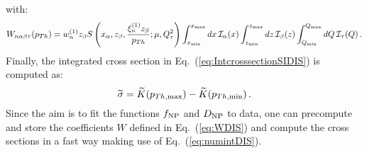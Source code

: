 \documentclass[10pt,a4paper]{article}
\begin{document}
with:
\begin{equation}\label{eq:WDIS}
 W_{n\alpha\beta\tau}(p_{Th}) = 
                                         w_n^{(1)} z_\beta S\left(x_\alpha,z_\beta,\frac{\xi_n^{(1)}z_\beta}{p_{Th}};\mu,Q_\tau^2\right) \int_{x_{\rm min}}^{x_{\rm
                                            max}}dx\,  \mathcal{I}_\alpha(x)\int_{z_{\rm min}}^{z_{\rm max}}dz\,
                                         \mathcal{I}_\beta(z)\int_{Q_{\rm min}}^{Q_{\rm
                                            max}}dQ\,\mathcal{I}_\tau(Q)\,.
\end{equation}
Finally, the integrated cross section in
Eq.~(\ref{eq:IntcrosssectionSIDIS}) is computed as:
\begin{equation}
\widetilde{\sigma} = \widetilde{K}(p_{Th,\rm max}) - \widetilde{K}(p_{Th,\rm min})\,.
\end{equation}
Since the aim is to fit the functions $f_{\rm NP}$ and $D_{\rm NP}$ to
data, one can precompute and store the coefficients $W$ defined in
Eq.~(\ref{eq:WDIS}) and compute the cross sections in a fast way
making use of Eq.~(\ref{eq:numintDIS}).



\begin{thebibliography}{alp}

\end{thebibliography}
\end{document}
